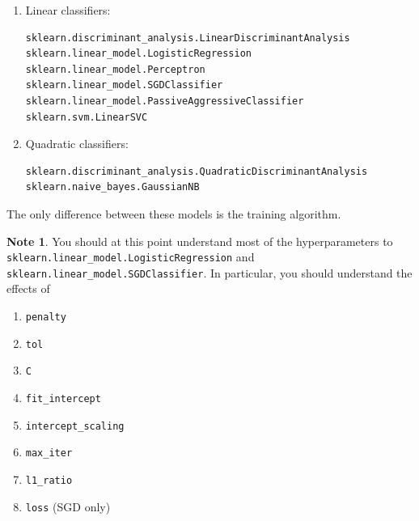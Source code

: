 \documentclass[10pt]{exam}
\theoremstyle{definition}
\newtheorem{note}{Note}
\newtheorem{fact}{Fact}
\newcommand{\Ein}{E_{\text{in}}}
\begin{document}
\begin{enumerate}
    \item
Linear classifiers:

\begin{verbatim}
sklearn.discriminant_analysis.LinearDiscriminantAnalysis
sklearn.linear_model.LogisticRegression
sklearn.linear_model.Perceptron
sklearn.linear_model.SGDClassifier
sklearn.linear_model.PassiveAggressiveClassifier
sklearn.svm.LinearSVC
\end{verbatim}

\item
Quadratic classifiers:

\begin{verbatim}
sklearn.discriminant_analysis.QuadraticDiscriminantAnalysis
sklearn.naive_bayes.GaussianNB
\end{verbatim}
\end{enumerate}


%
\noindent
The only difference between these models is the training algorithm.

    \vspace{3in}
\begin{note}
    You should at this point understand most of the hyperparameters to 
    \lstinline{sklearn.linear_model.LogisticRegression} and 
    \lstinline{sklearn.linear_model.SGDClassifier}. 
    In particular, you should understand the effects of
    \begin{enumerate}
        \item \lstinline{penalty}
        \item \lstinline{tol}
        \item \lstinline{C}
        \item \lstinline{fit_intercept}
        \item \lstinline{intercept_scaling}
        \item \lstinline{max_iter}
        \item \lstinline{l1_ratio}
        \item \lstinline{loss} (SGD only)
    \end{enumerate}
\end{note}
\end{document}
